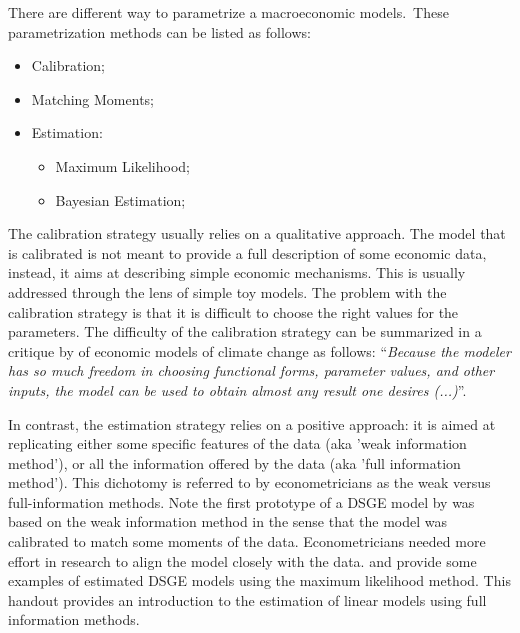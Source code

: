 \documentclass[a4paper,12pt]{article}%
\begin{document}
\noindent There are different way to parametrize a macroeconomic
models.\ These parametrization methods can be listed as follows:

\begin{itemize}
\item Calibration;

\item Matching Moments;

\item Estimation:

\begin{itemize}
\item Maximum Likelihood;

\item Bayesian Estimation;
\end{itemize}
\end{itemize}
The calibration strategy usually relies on a \textsf{qualitative approach}.
The model that is calibrated is not meant to provide a full description of
some economic data, instead, it aims at describing simple economic
mechanisms. This is usually addressed through the lens of simple toy models.
The problem with the calibration strategy is that it is difficult to choose the
right values for the parameters. The difficulty of the calibration strategy
can be summarized in a critique by \cite{pindyck2017use} of economic models of
climate change as follows: \textquotedblleft\textit{Because the modeler has so
much freedom in choosing functional forms, parameter values, and other inputs, the model can be used to obtain
almost any result one desires (...)}\textquotedblright.

In contrast, the estimation strategy relies on a positive approach: it is
aimed at replicating either some specific features of the data (aka
'\textsf{weak information method}'), or all the information offered by the
data (aka '\textsf{full information method}'). This dichotomy is referred to by
econometricians as the weak versus full-information methods. Note the first
prototype of a DSGE model by \cite{kydland1982time} was based on the weak
information method in the sense that the model was calibrated to match some
moments of the data. Econometricians needed more effort in research to align the
model closely with the data. \cite{taylor1990solving} and \cite{fair1990full} provide
some examples of estimated DSGE models using the maximum
likelihood method. This handout provides an introduction to the estimation of linear
models using full information methods.


\newpage
\end{document}
